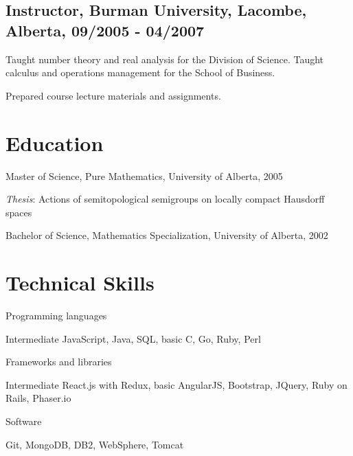 \documentclass[10.5pt, letterpaper]{article}
\renewenvironment{itemize}{
  \begin{list}{}{
    \setlength{\leftmargin}{1.5em}
  }
}{
  \end{list}
}
\begin{document}
\subsection*{Instructor, Burman University, Lacombe, Alberta, 09/2005 - 04/2007}
\begin{itemize}
\item Taught number theory and real analysis for the Division of Science.  Taught calculus and operations management for the School of Business.
\item Prepared course lecture materials and assignments.
\end{itemize}

\section*{Education}

\begin{itemize}
  \item Master of Science, Pure Mathematics, University of Alberta, 2005
    \begin{itemize}
    \item\textit{Thesis}: Actions of semitopological semigroups on locally compact Hausdorff spaces
    \end{itemize}

  \item Bachelor of Science, Mathematics Specialization, University of Alberta, 2002
\end{itemize}

\section*{Technical Skills}
\begin{itemize}
\item Programming languages 
  \begin{itemize}
    \item Intermediate JavaScript, Java, SQL, basic C, Go, Ruby, Perl
  \end{itemize}
\item Frameworks and libraries
    \begin{itemize}
            \item Intermediate React.js with Redux, basic AngularJS, Bootstrap, JQuery, Ruby on Rails, Phaser.io
    \end{itemize}
\item Software
  \begin{itemize}
          \item Git, MongoDB, DB2, WebSphere, Tomcat
  \end{itemize}
\end{itemize}
\bigskip
\end{document}
